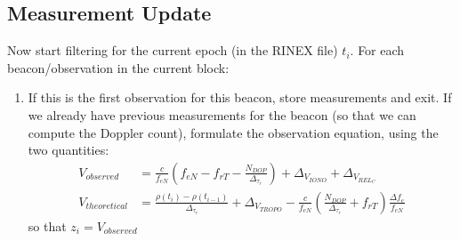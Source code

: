 \subsection{Measurement Update} \label{ssec:measurement-update}
Now start filtering for the current epoch (in the RINEX file) $t_i$. For each 
beacon/observation in the current block:
\begin{enumerate}

    \item If this is the first observation for this beacon, store measurements 
        and exit. If we already have previous measurements for the beacon (so 
        that we can compute the Doppler count), formulate the observation 
        equation, using the two quantities:
        \begin{equation}
            \begin{aligned}
              V_{observed} &= \frac{c}{f_{eN}} 
                \left( f_{eN} - f_{rT} - \frac{N_{DOP}}{\Delta _{\tau_r}} \right)
                + \Delta _{V_{IONO}} + \Delta _{V_{REL_C}} \\
              V_{theoretical} &= \frac{\rho(t_i) - \rho(t_{i-1})}{\Delta _{\tau_r}} + \Delta _{V_{TROPO}} 
                - \frac{c}{f_{eN}} \left( \frac{N_{DOP}}{\Delta _{\tau_r}} + f_{rT} \right) 
                \frac{\Delta f_e}{f_{eN}}
            \end{aligned}
          \end{equation}
        so that $z_i = V_{observed}$


\end{enumerate}
